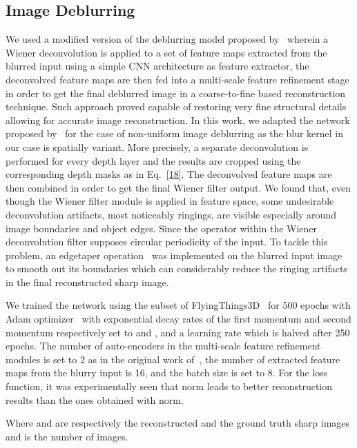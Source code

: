 \documentclass[preprint,5p,twocolumn]{elsarticle}
\begin{document}
\subsection{Image Deblurring}
\label{subsec:image_deblurring}


We used a modified version of the deblurring model proposed by~\cite{dong2021deep} wherein a Wiener deconvolution is applied to a set of feature maps extracted from the blurred input using a simple CNN architecture as feature extractor, the deconvolved feature maps are then fed into a multi-scale feature refinement stage in order to get the final deblurred image in a coarse-to-fine based reconstruction technique. Such approach proved capable of restoring very fine structural details allowing for accurate image reconstruction. In this work, we adapted the network proposed by~\cite{dong2021deep} for the case of non-uniform image deblurring as the blur kernel in our case is spatially variant. More precisely, a separate deconvolution is performed for every depth layer and the results are cropped using the corresponding depth masks  as in Eq.~\ref{18}. The deconvolved feature maps are then combined in order to get the final Wiener filter output. We found that, even though the Wiener filter module is applied in feature space, some undesirable deconvolution artifacts, most noticeably ringings, are visible especially around image boundaries and object edges. Since the  operator within the Wiener deconvolution filter supposes circular periodicity of the input. To tackle this problem, an edgetaper operation~\cite{reeves2005fast} was implemented on the blurred input image to smooth out its boundaries which can considerably reduce the ringing artifacts in the final reconstructed sharp image. 

We trained the network using the subset of FlyingThings3D~\cite{MIFDB16} for 500 epochs with Adam optimizer~\cite{kingma2014adam} with exponential decay rates of the first momentum and second momentum respectively set to  and , and a learning rate  which is halved after 250 epochs. The number of auto-encoders in the multi-scale feature refinement modules is set to 2 as in the original work of~\cite{dong2021deep},  the number of extracted feature maps from the blurry input is 16, and the batch size is set to 8. For the loss function, it was experimentally seen that  norm leads to better reconstruction results than the ones obtained with  norm.  



Where  and  are respectively the reconstructed and the ground truth sharp images and  is the number of images.
 
\end{document}
